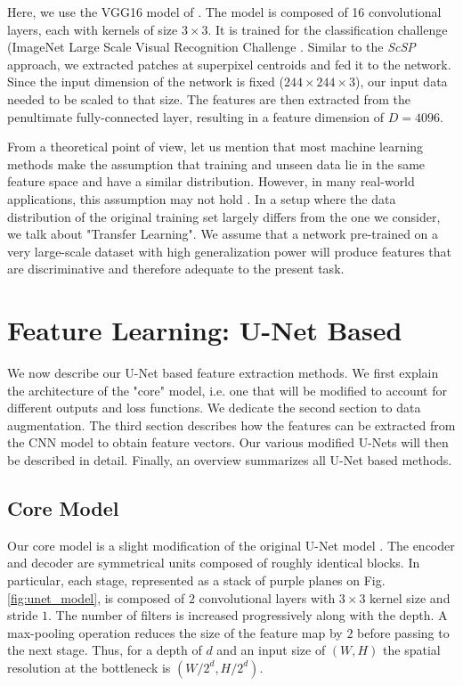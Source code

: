 \endgroup

Here, we use the VGG16 model of \cite[Tab. 1]{simonyan15}.
The model is composed of 16 convolutional layers, each with kernels of size $3 \times 3$.
It is trained for the classification challenge (ImageNet Large Scale Visual Recognition Challenge \cite{ILSVRC15}.
Similar to the \textit{ScSP} approach, we extracted patches at superpixel centroids and fed it to the network.
Since the input dimension of the network is fixed ($244 \times 244 \times 3$), our input data needed to be scaled to that size.
The features are then extracted from the penultimate fully-connected layer, resulting in a feature dimension of $D=4096$.

From a theoretical point of view, let us mention that most machine learning methods make the assumption that training and unseen data lie in the same feature space and have a similar distribution.
However, in many real-world applications, this assumption may not hold \cite{pan2010}.
In a setup where the data distribution of the original training set largely differs from the one we consider, we talk about "Transfer Learning".
We assume that a network pre-trained on a very large-scale dataset with high generalization power will produce features that are discriminative and therefore adequate to the present task.

\section{Feature Learning: U-Net Based} \label{ch:unet_based}
We now describe our U-Net based feature extraction methods.
We first explain the architecture of the "core" model, i.e. one that will be modified to account for different outputs and loss functions.
We dedicate the second section to data augmentation.
The third section describes how the features can be extracted from the CNN model to obtain feature vectors.
Our various modified U-Nets will then be described in detail.
Finally, an overview summarizes all U-Net based methods.

\subsection{Core Model} \label{model}
Our core model is a slight modification of the original U-Net model \cite{ronneberger15}.
The encoder and decoder are symmetrical units composed of roughly identical blocks.
In particular, each stage, represented as a stack of purple planes on Fig. \ref{fig:unet_model}, is composed of $2$ convolutional layers with $3 \times 3$ kernel size and stride $1$.
The number of filters is increased progressively along with the depth.
A max-pooling operation reduces the size of the feature map by $2$ before passing to the next stage.
Thus, for a depth of $d$ and an input size of $(W, H)$ the spatial resolution at the bottleneck is  $(W /2^d, H/2^{d})$.

